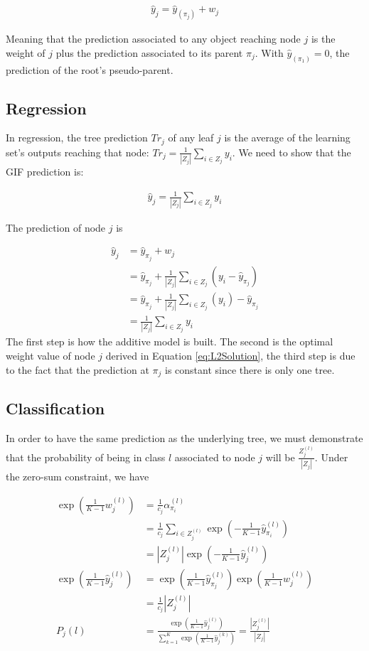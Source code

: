 \documentclass{article}
\begin{document}
\begin{align}
\hat{y}_j = \hat{y}_{(\pi_j)} + w_j
\end{align}

Meaning that the prediction associated to any object reaching node $j$ is the 
weight of $j$ plus the prediction associated to its parent $\pi_j$. With 
$\hat{y}_{(\pi_1)} = 0$, the prediction of the root's pseudo-parent.

\subsection{Regression}
In regression, the tree prediction $Tr_j$ of any leaf $j$ is the average of the 
learning set's outputs reaching that node: $Tr_j = \frac{1}{|Z_j|}\sum_{i \in 
Z_j} y_i$. We need to show that the GIF prediction is:

\begin{align}\label{eq:EquivL2Cond}
\hat{y}_{j} = \frac{1}{|Z_j|}\sum_{i \in Z_j} y_i
\end{align}


The prediction of node $j$ is

\begin{align}\label{eq:EquivL2Solution}
\hat{y}_j &= \hat{y}_{\pi_j} + w_j \\
&= \hat{y}_{\pi_j} +  \frac{1}{|Z_j|} \sum_{i \in Z_j} \left(y_i - 
\hat{y}_{\pi_j}\right) \\
&= \hat{y}_{\pi_j} + \frac{1}{|Z_j|} \sum_{i \in Z_j} \left( y_i \right) - 
\hat{y}_{\pi_j} \\
&= \frac{1}{|Z_j|} \sum_{i \in Z_j}  y_i 
\end{align}
The first step is how the additive model is built. The second is the optimal 
weight value of node $j$ derived in Equation \ref{eq:L2Solution}, the third 
step is due to the fact that the prediction at $\pi_j$ is constant since there 
is only one tree.

\subsection{Classification}
In order to have the same prediction as the underlying tree, we must 
demonstrate that the probability of being in class $l$ associated to node $j$ 
will be $\frac{Z_j^{(l)}}{|Z_j|}$.
Under the zero-sum constraint, we have

\begin{align} 
\exp \left(  \frac{1}{K-1} w_j^{(l)}\right) &= \frac{1}{c_j} 
\alpha_{\pi_i}^{(l)} \\
&=  \frac{1}{c_j} \sum_{i \in Z_j^{(l)}} \exp \left(-\frac{1}{K-1} 
\hat{y}_{\pi_i}^{(l)}\right)\\
&= |Z_j^{(l)}| \exp \left(-\frac{1}{K-1} \hat{y}_j^{(l)}\right) \\
\exp \left(\frac{1}{K-1} \hat{y}_j^{(l)} \right) &= \exp \left(\frac{1}{K-1} 
\hat{y}_{\pi_j}^{(l)} \right) \exp \left(\frac{1}{K-1} w_j^{(l)}\right) \\
&= \frac{1}{c_j} |Z_j^{(l)}| \\
P_j(l) &= \frac{\exp \left(\frac{1}{K-1} \hat{y}_j^{(l)}
\right)}{\sum_{k=1}^K\exp \left(\frac{1}{K-1} \hat{y}_j^{(k)} \right)} = 
\frac{|Z_j^{(l)}|}{|Z_j|}
\end{align}
\end{document}
